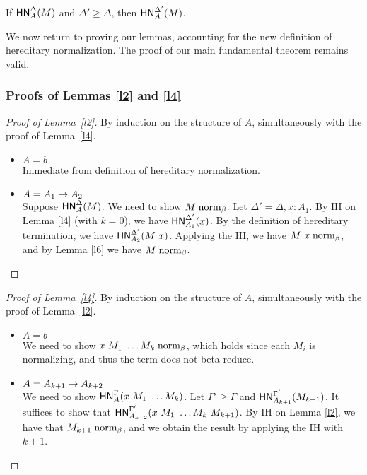 \documentclass{article}
\begin{document}
\begin{remark}[Monotonicity]
If $\mathsf{HN}^{\Delta}_{A}(M)$ and $\Delta' \ge \Delta$, then $\mathsf{HN}^{\Delta'}_{A}(M)$.
\end{remark}

We now return to proving our lemmas, accounting for the new definition of hereditary
normalization.  The proof of our main fundamental theorem remains valid.

\subsubsection{Proofs of Lemmas \ref{l2} and \ref{l4}}

\begin{proof}[Proof of Lemma~\ref{l2}]
By induction on the structure of $A$, simultaneously with the proof of Lemma~\ref{l4}.
\begin{itemize}
  \setlength\itemsep{1em}
  \item $A = b$\\
  Immediate from definition of hereditary normalization.
  \item $A = A_1 \to A_2$\\
  Suppose $\mathsf{HN}^{\Delta}_{A}(M)$. We need to show $M \mathrel{\text{norm}_\beta}$. Let $\Delta' = \Delta, x : A_1$. By IH on Lemma \ref{l4}
  (with $k = 0$), we have $\mathsf{HN}^{\Delta'}_{A_1}(x)$. By the definition of hereditary termination, we have
  $\mathsf{HN}^{\Delta'}_{A_2}(M\ x)$. Applying the IH, we have $M\ x \mathrel{\text{norm}_\beta}$, and by Lemma \ref{l6} we have
  $M \mathrel{\text{norm}_\beta}$.
  \qedhere
\end{itemize}
\end{proof}

\begin{proof}[Proof of Lemma~\ref{l4}]
By induction on the structure of $A$, simultaneously with the proof of Lemma~\ref{l2}.
\begin{itemize}
  \setlength\itemsep{1em}
  \item $A = b$\\
  We need to show $x\ M_1\ \dots M_k \mathrel{\text{norm}_\beta}$, which holds since each $M_i$ is normalizing, and thus the
  term does not beta-reduce.
  \item $A = A_{k+1} \to A_{k+2}$\\
  We need to show $\mathsf{HN}^{\Gamma}_{A}(x\ M_1\ \dots M_k)$. Let $\Gamma' \ge \Gamma$ and
  $\mathsf{HN}^{\Gamma'}_{A_{k+1}}(M_{k+1})$. It suffices to show that
  $\mathsf{HN}^{\Gamma'}_{A_{k+2}}(x\ M_1\ \dots M_k\ M_{k+1})$.
  By IH on Lemma \ref{l2}, we have that $M_{k+1} \mathrel{\text{norm}_\beta}$, and we obtain the result by applying the IH with $k + 1$.
\end{itemize}
\end{proof}
\end{document}
